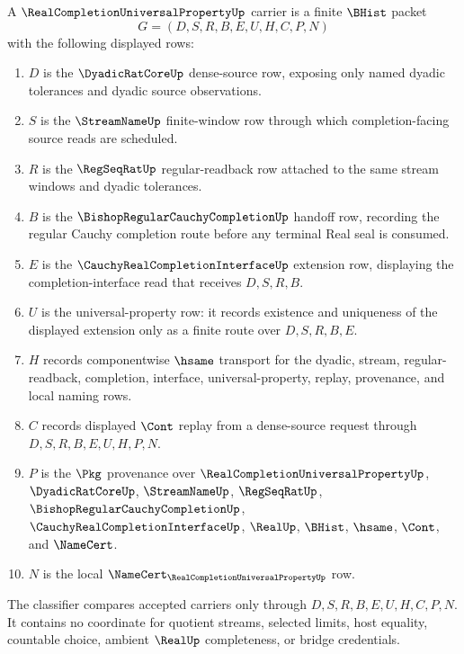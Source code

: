 \begin{definition}
\label{def:real-completion-universal-property-carrier}
A $\RealCompletionUniversalPropertyUp$ carrier is a finite $\BHist$ packet
$$
G=(D,S,R,B,E,U,H,C,P,N)
$$
with the following displayed rows:
\begin{enumerate}
\item $D$ is the $\DyadicRatCoreUp$ dense-source row, exposing only named dyadic tolerances and dyadic source observations.
\item $S$ is the $\StreamNameUp$ finite-window row through which completion-facing source reads are scheduled.
\item $R$ is the $\RegSeqRatUp$ regular-readback row attached to the same stream windows and dyadic tolerances.
\item $B$ is the $\BishopRegularCauchyCompletionUp$ handoff row, recording the regular Cauchy completion route before any terminal Real seal is consumed.
\item $E$ is the $\CauchyRealCompletionInterfaceUp$ extension row, displaying the completion-interface read that receives $D,S,R,B$.
\item $U$ is the universal-property row: it records existence and uniqueness of the displayed extension only as a finite route over $D,S,R,B,E$.
\item $H$ records componentwise $\hsame$ transport for the dyadic, stream, regular-readback, completion, interface, universal-property, replay, provenance, and local naming rows.
\item $C$ records displayed $\Cont$ replay from a dense-source request through $D,S,R,B,E,U,H,P,N$.
\item $P$ is the $\Pkg$ provenance over $\RealCompletionUniversalPropertyUp$, $\DyadicRatCoreUp$, $\StreamNameUp$, $\RegSeqRatUp$, $\BishopRegularCauchyCompletionUp$, $\CauchyRealCompletionInterfaceUp$, $\RealUp$, $\BHist$, $\hsame$, $\Cont$, and $\NameCert$.
\item $N$ is the local $\NameCert_{\RealCompletionUniversalPropertyUp}$ row.
\end{enumerate}
The classifier compares accepted carriers only through $D,S,R,B,E,U,H,C,P,N$. It contains no coordinate for quotient streams, selected limits, host equality, countable choice, ambient $\RealUp$ completeness, or bridge credentials.
\end{definition}

